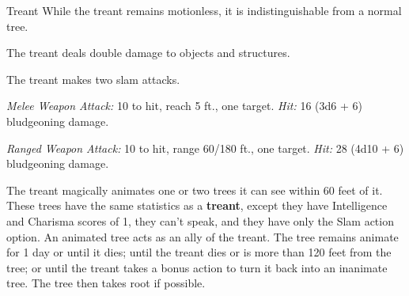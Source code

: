 \documentclass[10pt,a4paper,twoside,bg=print,twocolumn,openany,nodeprecatedcode]{dndbook}
\begin{document}
\begin{DndMonster}[float=t]{Treant}
\DndMonsterBasics[
armor-class = {16 (natural armor)},
hit-points = {\DndDice{12d12 + 60}},
speed = {30 ft.}
]
\DndMonsterAbilityScores[
 str = 23,
 dex = 8,
 con = 21,
 int = 12,
 wis = 16,
 cha = 12
]
\DndMonsterDetails[
damage-vulnerabilities = {fire},
damage-resistances = {bludgeoning, piercing},
languages = {Common, Druidic, Elvish, Sylvan},
challenge = 9,
]
While the treant remains motionless, it is indistinguishable from a normal tree.

The treant deals double damage to objects and structures.

The treant makes two slam attacks.

\textsl{Melee Weapon Attack:} 10 to hit, reach 5 ft., one target. \textsl{Hit:} 16 (3d6 + 6) bludgeoning damage.

\textsl{Ranged Weapon Attack:} 10 to hit, range 60/180 ft., one target. \textsl{Hit:} 28 (4d10 + 6) bludgeoning damage.

The treant magically animates one or two trees it can see within 60 feet of it. These trees have the same statistics as a \textbf{treant}, except they have Intelligence and Charisma scores of 1, they can't speak, and they have only the Slam action option. An animated tree acts as an ally of the treant. The tree remains animate for 1 day or until it dies; until the treant dies or is more than 120 feet from the tree; or until the treant takes a bonus action to turn it back into an inanimate tree. The tree then takes root if possible.

\end{DndMonster}
\end{document}
